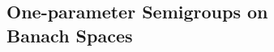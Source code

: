 % 
%

\begin{partbacktext}
\part[One-parameter Semigroups on Banach Spaces]{One-parameter Semigroups on \\Banach Spaces }
\end{partbacktext}